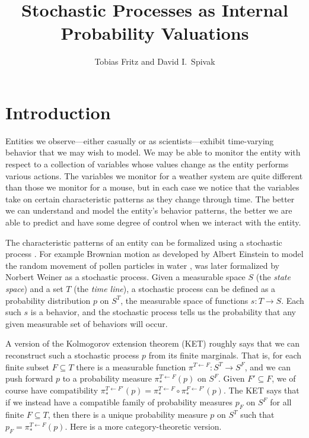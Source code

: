 \documentclass[11pt, oneside, article]{memoir}
\theoremstyle{plain}
\theoremstyle{definition}
\theoremstyle{remark}
\renewcommand{\ss}{\subseteq}
\newcommand{\from}{\leftarrow}
\begin{document}
\title{Stochastic Processes as Internal Probability Valuations}
\author{Tobias Fritz and David I.\ Spivak}
\date{\vspace{-.3in}}

\maketitle

\begin{abstract}

\end{abstract}



\chapter{Introduction}

Entities we observe---either casually or as scientists---exhibit time-varying behavior that we may wish to model. We may be able to monitor the entity with respect to a collection of variables whose values change as the entity performs various actions. The variables we monitor for a weather system are quite different than those we monitor for a mouse, but in each case we notice that the variables take on certain characteristic patterns as they change through time. The better we can understand and model the entity's behavior patterns, the better we are able to predict and have some degree of control when we interact with the entity.

The characteristic patterns of an entity can be formalized using a stochastic process \cite{doob1934stochastic}. For example Brownian motion as developed by Albert Einstein to model the random movement of pollen particles in water \cite{einstein1956investigations}, was later formalized by Norbert Weiner as a stochastic process. Given a measurable space $S$ (the \emph{state space}) and a set $T$ (the \emph{time line}), a stochastic process can be defined as a probability distribution $p$ on $S^T$, the measurable space of functions $s\colon T\to S$. Each such $s$ is a behavior, and the stochastic process tells us the probability that any given measurable set of behaviors will occur.

A version of the Kolmogorov extension theorem (KET) roughly says that we can reconstruct such a stochastic process $p$ from its finite marginals. That is, for each finite subset $F\ss T$ there is a measurable function $\pi^{T\from F}\colon S^T\to S^F$, and we can push forward $p$ to a probability measure $\pi^{T\from F}_*(p)$ on $S^F$. Given $F'\ss F$, we of course have compatibility $\pi^{T\from F'}_*(p)=\pi^{T\from F}_*\circ\pi^{F\from F'}_*(p)$. The KET says that if we instead have a compatible family of probability measures $p_F$ on $S^F$ for all finite $F\ss T$, then there is a unique probability measure $p$ on $S^T$ such that $p_F=\pi^{T\from F}_*(p)$. Here is a more category-theoretic version.
\end{document}
